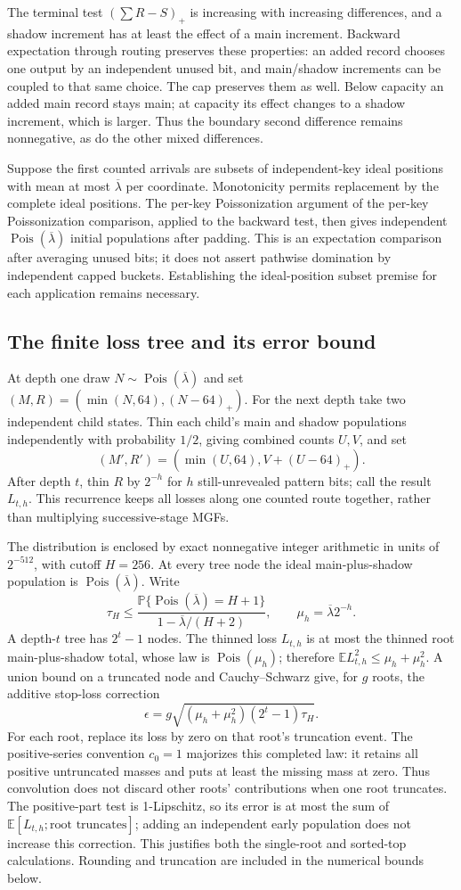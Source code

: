 \documentclass[11pt]{article}
\theoremstyle{definition}
\theoremstyle{remark}
\newcommand{\E}{\mathbb E}
\newcommand{\Prb}{\mathbb P}
\newcommand{\Pois}{\operatorname{Pois}}
\newcommand{\lam}{\overline\lambda}
\begin{document}
The terminal test $(\sum R-S)_+$ is increasing with increasing differences,
and a shadow increment has at least the effect of a main increment.
Backward expectation through routing preserves these properties: an added
record chooses one output by an independent unused bit, and main/shadow
increments can be coupled to that same choice. The cap preserves them as
well. Below capacity an added main record stays main; at capacity its
effect changes to a shadow increment, which is larger. Thus the boundary
second difference remains nonnegative, as do the other mixed differences.

Suppose the first counted arrivals are subsets of independent-key ideal
positions with mean at most $\lam$ per coordinate. Monotonicity permits
replacement by the complete ideal positions. The per-key Poissonization
argument of the per-key Poissonization comparison, applied to the backward test,
then gives independent $\Pois(\lam)$ initial populations after padding.
This is an expectation comparison after averaging unused bits; it does
not assert pathwise domination by independent capped buckets. Establishing
the ideal-position subset premise for each application remains necessary.

\subsection{The finite loss tree and its error bound}
At depth one draw $N\sim\Pois(\lam)$ and set
$(M,R)=(\min(N,64),(N-64)_+)$. For the next depth take two independent
child states. Thin each child's main and shadow populations independently
with probability $1/2$, giving combined counts $U,V$, and set
\[
 (M',R')=(\min(U,64),V+(U-64)_+).
\]
After depth $t$, thin $R$ by $2^{-h}$ for $h$ still-unrevealed pattern bits;
call the result $L_{t,h}$. This recurrence keeps all losses along one
counted route together, rather than multiplying successive-stage MGFs.

The distribution is enclosed by exact nonnegative integer arithmetic in
units of $2^{-512}$, with cutoff $H=256$. At every tree node the ideal
main-plus-shadow population is $\Pois(\lam)$. Write
\[
 \tau_H\le\frac{\Prb\{\Pois(\lam)=H+1\}}{1-\lam/(H+2)},
 \qquad \mu_h=\lam 2^{-h}.
\]
A depth-$t$ tree has $2^t-1$ nodes. The thinned loss $L_{t,h}$ is at most
the thinned root main-plus-shadow total, whose law is $\Pois(\mu_h)$;
therefore $\E L_{t,h}^2\le\mu_h+\mu_h^2$. A union bound on a truncated
node and Cauchy--Schwarz give, for $g$ roots,
the additive stop-loss correction
\[
 \epsilon=g\sqrt{(\mu_h+\mu_h^2)(2^t-1)\tau_H}.
\]
For each root, replace its loss by zero on that root's truncation event.
The positive-series convention $c_0=1$ majorizes this completed law:
it retains all positive untruncated masses and puts at least the missing
mass at zero. Thus convolution does not discard other roots' contributions
when one root truncates. The positive-part test is 1-Lipschitz, so its
error is at most the sum of $\E[L_{t,h};\text{root truncates}]$;
adding an independent early population does not increase this correction.
This justifies both the single-root and sorted-top calculations.
Rounding and truncation are included in the numerical bounds below.
\end{document}
